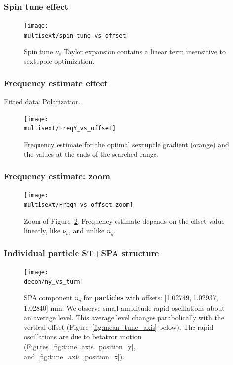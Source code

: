 \documentclass{beamer}
\newcommand{\home}{\string~}
\newcommand{\Artem}{\home/REPOS/COSYINF/img/Artem}
\newcommand{\multisext}{\Artem/multisext_test}
\newcommand{\decoh}{\Artem/decoherence_frequency_dependence}
\begin{document}
\begin{frame}\frametitle{Spin tune effect}
  \begin{figure}[H]
    \centering
    \texttt{[image: \\multisext/spin\_tune\_vs\_offset]}
    \caption{Spin tune $\nu_s$ Taylor expansion contains a linear term insensitive to sextupole optimization.\label{fig:SpinTune_vs_Y0_GSY}}
  \end{figure}
\end{frame}
\begin{frame}\frametitle{Frequency estimate effect}
  Fitted data: Polarization.
  \begin{figure}[H]
    \centering
    \texttt{[image: \\multisext/FreqY\_vs\_offset]}
    \caption{Frequency estimate for the optimal sextupole gradient (orange) and the values at the ends of the searched range.\label{fig:FreqY_vs_offset}}
  \end{figure}
\end{frame}
\begin{frame}\frametitle{Frequency estimate: zoom}
  \begin{figure}[H]
    \texttt{[image: \\multisext/FreqY\_vs\_offset\_zoom]}
    \caption{Zoom of Figure~\ref{fig:FreqY_vs_offset}. Frequency estimate depends on the offset value linearly,
      like  $\nu_s$, and unlike $\bar n_y$.}
  \end{figure}
\end{frame}

\begin{frame}\frametitle{Individual particle ST+SPA structure}
  \begin{figure}[H]
  \centering
  \texttt{[image: \\decoh/ny\_vs\_turn]}
  \caption{SPA component $\bar n_y$ for \textbf{particles} with offsets:
    [1.02749, 1.02937, 1.02840] mm. We observe small-amplitude rapid oscillations about
    an average level. This average level changes parabolically with the vertical
    offset (Figure~\ref{fig:mean_tune_axis} below). The rapid oscillations are
    due to betatron motion (Figures~\ref{fig:tune_axis_position_y},
    and~\ref{fig:tune_axis_position_x}).\label{fig:ny_vs_turn}}
\end{figure}
\end{frame}
\end{document}
